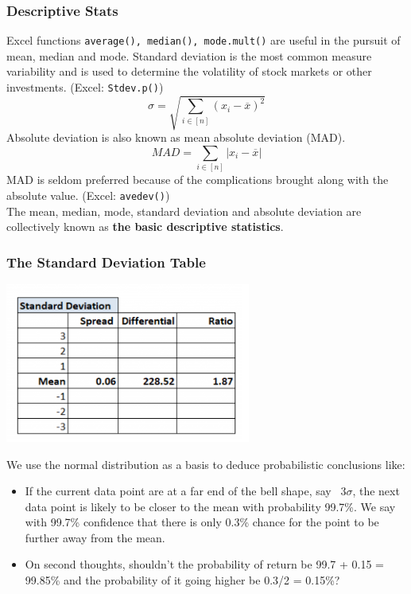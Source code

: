 \documentclass{article}
\begin{document}
\subsubsection{Descriptive Stats}
Excel functions \texttt{average(), median(), mode.mult()} are useful in the 
pursuit of mean, median and mode. Standard deviation is the most common measure 
variability and is used to determine the volatility of stock markets or other 
investments. (Excel: \texttt{Stdev.p()})
\begin{equation}
    \sigma = \sqrt{\sum_{i\in [n]}{(x_i-\overline{x})^2}}
\end{equation}
Absolute deviation is also known as mean absolute deviation (MAD).
\begin{equation}
    MAD = \sum_{i\in[n]}{|x_i - \overline{x}|}
\end{equation}
MAD is seldom preferred because of the complications brought along with the
absolute value. (Excel: \texttt{avedev()})\\
The mean, median, mode, standard deviation and absolute deviation are 
collectively known as \textbf{the basic descriptive statistics}.
\subsubsection{The Standard Deviation Table}
\begin{center}
    \includegraphics{rsrc/stdtable.png}
\end{center}
We use the normal distribution as a basis to deduce probabilistic conclusions like:
\begin{itemize}
    \item If the current data point are at a far end of the bell shape, say ~$3\sigma$, the next data point is likely to be closer to the mean with probability 99.7\%. We say with 99.7\% confidence that there is only 0.3\% chance for the point to be further away from the mean.
    \item On second thoughts, shouldn't the probability of return be 99.7 + 0.15
    = 99.85\% and the probability of it going higher be 0.3/2 = 0.15\%?
\end{itemize}
\end{document}
